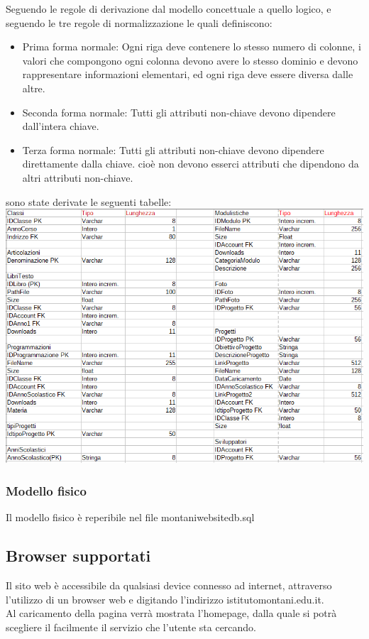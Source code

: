 \documentclass{article}
\begin{document}
	Seguendo le regole di derivazione dal modello concettuale a quello logico, e seguendo le tre regole di normalizzazione le quali definiscono:
	\begin{itemize}
		\item Prima forma normale: Ogni riga deve contenere lo stesso numero di colonne, i valori che compongono ogni colonna devono avere lo stesso dominio e devono rappresentare informazioni elementari, ed ogni riga deve essere diversa dalle altre.\\
		\item Seconda forma normale: Tutti gli attributi non-chiave devono dipendere dall'intera chiave.\\
		\item Terza forma normale: Tutti gli attributi non-chiave devono dipendere direttamente dalla chiave. cioè non devono esserci attributi che dipendono da altri attributi non-chiave.
	\end{itemize}
	sono state derivate le seguenti tabelle:\\
	\includegraphics[scale=0.5]{modellologico.png}\\
	\subsubsection{\textbf{Modello fisico}}
	Il modello fisico è reperibile nel file montaniwebsitedb.sql\\
	\subsection{\textbf{Browser supportati}}
	Il sito web è accessibile da qualsiasi device connesso ad internet, attraverso l'utilizzo di un browser web e digitando l'indirizzo istitutomontani.edu.it.\\
	Al caricamento della pagina verrà mostrata l'homepage, dalla quale si potrà scegliere il facilmente il servizio che l'utente sta cercando. 
	
\end{document}

